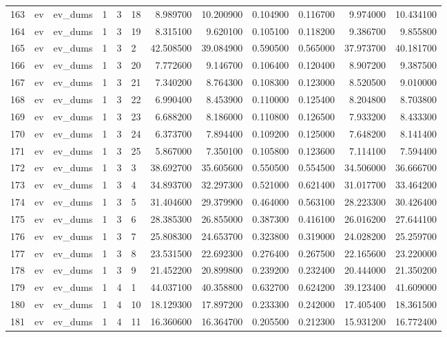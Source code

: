 \begin{tabular}{llllllrrrrrr}
163 & ev & ev_dums & 1 & 3 & 18 & 8.989700 & 10.200900 & 0.104900 & 0.116700 & 9.974000 & 10.434100 \\
164 & ev & ev_dums & 1 & 3 & 19 & 8.315100 & 9.620100 & 0.105100 & 0.118200 & 9.386700 & 9.855800 \\
165 & ev & ev_dums & 1 & 3 & 2 & 42.508500 & 39.084900 & 0.590500 & 0.565000 & 37.973700 & 40.181700 \\
166 & ev & ev_dums & 1 & 3 & 20 & 7.772600 & 9.146700 & 0.106400 & 0.120400 & 8.907200 & 9.387500 \\
167 & ev & ev_dums & 1 & 3 & 21 & 7.340200 & 8.764300 & 0.108300 & 0.123000 & 8.520500 & 9.010000 \\
168 & ev & ev_dums & 1 & 3 & 22 & 6.990400 & 8.453900 & 0.110000 & 0.125400 & 8.204800 & 8.703800 \\
169 & ev & ev_dums & 1 & 3 & 23 & 6.688200 & 8.186000 & 0.110800 & 0.126500 & 7.933200 & 8.433300 \\
170 & ev & ev_dums & 1 & 3 & 24 & 6.373700 & 7.894400 & 0.109200 & 0.125000 & 7.648200 & 8.141400 \\
171 & ev & ev_dums & 1 & 3 & 25 & 5.867000 & 7.350100 & 0.105800 & 0.123600 & 7.114100 & 7.594400 \\
172 & ev & ev_dums & 1 & 3 & 3 & 38.692700 & 35.605600 & 0.550500 & 0.554500 & 34.506000 & 36.666700 \\
173 & ev & ev_dums & 1 & 3 & 4 & 34.893700 & 32.297300 & 0.521000 & 0.621400 & 31.017700 & 33.464200 \\
174 & ev & ev_dums & 1 & 3 & 5 & 31.404600 & 29.379900 & 0.464000 & 0.563100 & 28.223300 & 30.426400 \\
175 & ev & ev_dums & 1 & 3 & 6 & 28.385300 & 26.855000 & 0.387300 & 0.416100 & 26.016200 & 27.644100 \\
176 & ev & ev_dums & 1 & 3 & 7 & 25.808300 & 24.653700 & 0.323800 & 0.319000 & 24.028200 & 25.259700 \\
177 & ev & ev_dums & 1 & 3 & 8 & 23.531500 & 22.692300 & 0.276400 & 0.267500 & 22.165600 & 23.220000 \\
178 & ev & ev_dums & 1 & 3 & 9 & 21.452200 & 20.899800 & 0.239200 & 0.232400 & 20.444000 & 21.350200 \\
179 & ev & ev_dums & 1 & 4 & 1 & 44.037100 & 40.358800 & 0.632700 & 0.624200 & 39.123400 & 41.609000 \\
180 & ev & ev_dums & 1 & 4 & 10 & 18.129300 & 17.897200 & 0.233300 & 0.242000 & 17.405400 & 18.361500 \\
181 & ev & ev_dums & 1 & 4 & 11 & 16.360600 & 16.364700 & 0.205500 & 0.212300 & 15.931200 & 16.772400 \\

\end{tabular}
